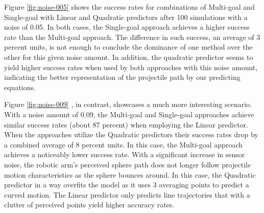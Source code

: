 \documentclass[letterpaper, 10 pt, conference]{ieeeconf}  %
\begin{document}
Figure \ref{fig:noise-005} shows the success rates for combinations of
Multi-goal and Single-goal with Linear and Quadratic predictors after
100 simulations with a noise of 0.05. In both cases, the Single-goal
approach achieves a higher success rate than the Multi-goal approach.
The difference in such success, an average of 3 percent units, is not
enough to conclude the dominance of one method over the other for this
given noise amount. In addition, the quadratic predictor seems to yield
higher success rates when used by both approaches with this noise
amount, indicating the better representation of the projectile path by
our predicting equations.

Figure \ref{fig:noise-009} , in contrast, showcases a much more
interesting scenario. With a noise amount of 0.09, the Multi-goal and
Single-goal approaches achieve similar success rates (about 87 percent)
when employing the Linear predictor. When the approaches utilize the
Quadratic predictors their success rates drop by a combined average of 8
percent units. In this case, the Multi-goal approach achieves a
noticeably lower success rate. With a significant increase in sensor
noise, the robotic arm’s perceived sphere path does not longer follow
projectile motion characteristics as the sphere bounces around. In this
case, the Quadratic predictor in a way overfits the model as it uses 3
averaging points to predict a curved motion. The Linear predictor only
predicts line trajectories that with a clutter of perceived points yield
higher accuracy rates.
\end{document}
